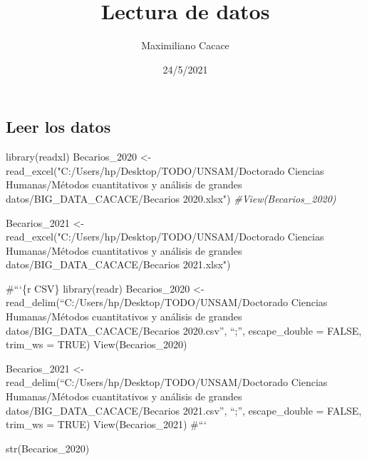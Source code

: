 \documentclass[
]{article}
\title{Lectura de datos}
\author{Maximiliano Cacace}
\date{24/5/2021}
\newenvironment{Shaded}{\begin{snugshade}}{\end{snugshade}}
\newcommand{\CommentTok}[1]{\textcolor[rgb]{0.56,0.35,0.01}{\textit{#1}}}
\newcommand{\FunctionTok}[1]{\textcolor[rgb]{0.00,0.00,0.00}{#1}}
\newcommand{\NormalTok}[1]{#1}
\newcommand{\OtherTok}[1]{\textcolor[rgb]{0.56,0.35,0.01}{#1}}
\newcommand{\StringTok}[1]{\textcolor[rgb]{0.31,0.60,0.02}{#1}}
\begin{document}
\maketitle

\hypertarget{leer-los-datos}{%
\subsection{Leer los datos}\label{leer-los-datos}}

\begin{Shaded}
\begin{Highlighting}[]
\FunctionTok{library}\NormalTok{(readxl)}
\NormalTok{Becarios\_2020 }\OtherTok{\textless{}{-}} \FunctionTok{read\_excel}\NormalTok{(}\StringTok{"C:/Users/hp/Desktop/TODO/UNSAM/Doctorado Ciencias Humanas/Métodos cuantitativos y análisis de grandes datos/BIG\_DATA\_CACACE/Becarios 2020.xlsx"}\NormalTok{)}
\CommentTok{\#View(Becarios\_2020)}

\NormalTok{Becarios\_2021 }\OtherTok{\textless{}{-}} \FunctionTok{read\_excel}\NormalTok{(}\StringTok{"C:/Users/hp/Desktop/TODO/UNSAM/Doctorado Ciencias Humanas/Métodos cuantitativos y análisis de grandes datos/BIG\_DATA\_CACACE/Becarios 2021.xlsx"}\NormalTok{)}
\end{Highlighting}
\end{Shaded}

\#```\{r CSV\} library(readr) Becarios\_2020 \textless-
read\_delim(``C:/Users/hp/Desktop/TODO/UNSAM/Doctorado Ciencias
Humanas/Métodos cuantitativos y análisis de grandes
datos/BIG\_DATA\_CACACE/Becarios 2020.csv'', ``;'', escape\_double =
FALSE, trim\_ws = TRUE) View(Becarios\_2020)

Becarios\_2021 \textless-
read\_delim(``C:/Users/hp/Desktop/TODO/UNSAM/Doctorado Ciencias
Humanas/Métodos cuantitativos y análisis de grandes
datos/BIG\_DATA\_CACACE/Becarios 2021.csv'', ``;'', escape\_double =
FALSE, trim\_ws = TRUE) View(Becarios\_2021) \#```

\begin{Shaded}
\begin{Highlighting}[]
\FunctionTok{str}\NormalTok{(Becarios\_2020)}
\end{Highlighting}
\end{Shaded}
\end{document}
